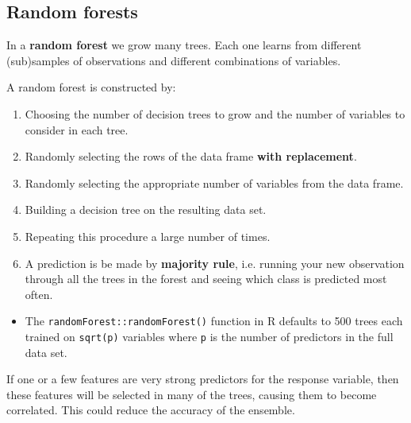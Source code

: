 \documentclass[a4paper]{article}\usepackage[]{graphicx}\usepackage[]{xcolor}
\begin{document}
\subsection{Random forests}
\begin{goldbox}
	In a \textbf{random forest} we grow many trees. Each one learns from different (sub)samples of observations and different combinations of variables.
\end{goldbox}
A random forest is constructed by:
\begin{enumerate}
	\item Choosing the number of decision trees to grow and the number of variables to consider in each tree.
	\item Randomly selecting the rows of the data frame \textbf{with replacement}.
	\item Randomly selecting the appropriate number of variables from the data frame.
	\item Building a decision tree on the resulting data set.
	\item Repeating this procedure a large number of times.
	\item A prediction is be made by \textbf{majority rule}, i.e. running your new observation through all the trees in the forest and seeing which class is predicted most often.
\end{enumerate}
\begin{itemize}
	\item The \lstinline|randomForest::randomForest()| function in R defaults to 500 trees each trained on \lstinline|sqrt(p)| variables where \lstinline|p| is the number of predictors in the full data set.
\end{itemize}
\begin{tcolorbox}[greenstylecolor, title=Why do we randomly select the features?]
	If one or a few features are very strong predictors for the response variable, then these features will be selected in many of the trees, causing them to become correlated. \textcolor{mygold}{This could reduce the accuracy of the ensemble}.
\end{tcolorbox}
\end{document}
